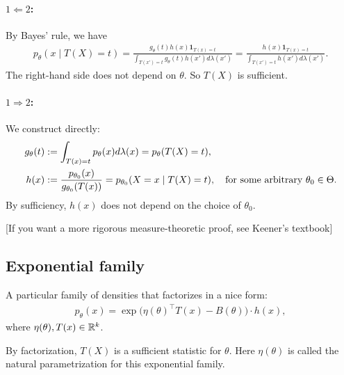 \documentclass[11pt,letterpaper]{article}
\numberwithin{theorem}{lecture}
\numberwithin{proposition}{lecture}
\numberwithin{lemma}{lecture}
\numberwithin{claim}{lecture}
\numberwithin{corollary}{lecture}
\numberwithin{definition}{lecture}
\numberwithin{conjecture}{lecture}
\numberwithin{remark}{lecture}
\numberwithin{example}{lecture}
\numberwithin{equation}{lecture}
\begin{document}
\paragraph{$1 \Leftarrow 2$:} By Bayes' rule, we have
\begin{align*}
  p_\theta (x \mid T(X) = t) = \frac{ g_\theta (t) h (x) \bm{1}_{T(x) = t}}{\int_{ T(x') = t} g_\theta (t) h (x') d\lambda(x')} = \frac{h (x) \bm{1}_{T(x) = t}}{\int_{ T(x') = t} h (x') d\lambda(x')}.
\end{align*}
The right-hand side does not depend on $\theta$. So $T(X)$ is sufficient.
\paragraph{$1 \Rightarrow 2$:} We construct directly:
\begin{align*}
  g_\theta (t) &:= \int_{T(x) = t} p_\theta (x) d\lambda(x) = p_\theta (T(X) = t),\\
  h(x) &:= \frac{p_{\theta_0} (x)}{g_{\theta_0} (T(x))} = p_{\theta_0} (X = x \mid T(X) = t), \quad \text{for some arbitrary } \theta_0 \in \Theta.
\end{align*}
By sufficiency, $h (x)$ does not depend on the choice of $\theta_0$.

[If you want a more rigorous measure-theoretic proof, see Keener's textbook]

\subsection{Exponential family}
A particular family of densities that factorizes in a nice form:
\begin{align*}
  p_\theta (x) = \exp \big( \eta (\theta)^\top T (x) - B (\theta) \big) \cdot h (x),
\end{align*}
where $\eta (\theta), T(x) \in \mathbb{R}^k$.

By factorization, $T (X)$ is a sufficient statistic for $\theta$. Here $\eta (\theta)$ is called the natural parametrization for this exponential family.
\end{document}
